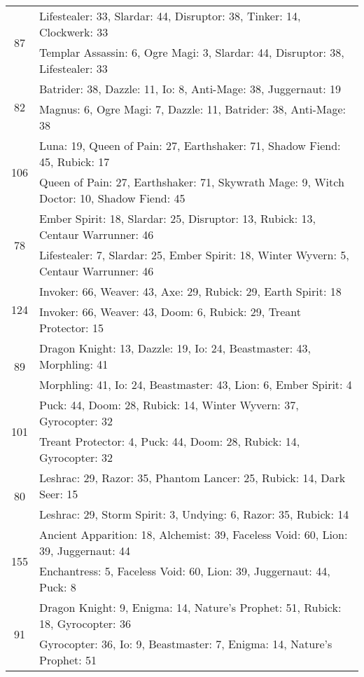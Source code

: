 \documentclass[result.tex]{subfiles}
\begin{document}
\begin{table}[H]
\begin{tabular}{ | c | p{12.5cm} | }
\hline
\multirow{2}{*}{87}
& Lifestealer: 33, Slardar: 44, Disruptor: 38, Tinker: 14, Clockwerk: 33 \\
& Templar Assassin: 6, Ogre Magi: 3, Slardar: 44, Disruptor: 38, Lifestealer: 33 \\
\hline
\multirow{2}{*}{82}
& Batrider: 38, Dazzle: 11, Io: 8, Anti-Mage: 38, Juggernaut: 19 \\
& Magnus: 6, Ogre Magi: 7, Dazzle: 11, Batrider: 38, Anti-Mage: 38 \\
\hline
\multirow{2}{*}{106}
& Luna: 19, Queen of Pain: 27, Earthshaker: 71, Shadow Fiend: 45, Rubick: 17 \\
& Queen of Pain: 27, Earthshaker: 71, Skywrath Mage: 9, Witch Doctor: 10, Shadow Fiend: 45 \\
\hline
\multirow{2}{*}{78}
& Ember Spirit: 18, Slardar: 25, Disruptor: 13, Rubick: 13, Centaur Warrunner: 46 \\
& Lifestealer: 7, Slardar: 25, Ember Spirit: 18, Winter Wyvern: 5, Centaur Warrunner: 46 \\
\hline
\multirow{2}{*}{124}
& Invoker: 66, Weaver: 43, Axe: 29, Rubick: 29, Earth Spirit: 18 \\
& Invoker: 66, Weaver: 43, Doom: 6, Rubick: 29, Treant Protector: 15 \\
\hline
\multirow{2}{*}{89}
& Dragon Knight: 13, Dazzle: 19, Io: 24, Beastmaster: 43, Morphling: 41 \\
& Morphling: 41, Io: 24, Beastmaster: 43, Lion: 6, Ember Spirit: 4 \\
\hline
\multirow{2}{*}{101}
& Puck: 44, Doom: 28, Rubick: 14, Winter Wyvern: 37, Gyrocopter: 32 \\
& Treant Protector: 4, Puck: 44, Doom: 28, Rubick: 14, Gyrocopter: 32 \\
\hline
\multirow{2}{*}{80}
& Leshrac: 29, Razor: 35, Phantom Lancer: 25, Rubick: 14, Dark Seer: 15 \\
& Leshrac: 29, Storm Spirit: 3, Undying: 6, Razor: 35, Rubick: 14 \\
\hline
\multirow{2}{*}{155}
& Ancient Apparition: 18, Alchemist: 39, Faceless Void: 60, Lion: 39, Juggernaut: 44 \\
& Enchantress: 5, Faceless Void: 60, Lion: 39, Juggernaut: 44, Puck: 8 \\
\hline
\multirow{2}{*}{91}
& Dragon Knight: 9, Enigma: 14, Nature's Prophet: 51, Rubick: 18, Gyrocopter: 36 \\
& Gyrocopter: 36, Io: 9, Beastmaster: 7, Enigma: 14, Nature's Prophet: 51 \\

\end{tabular}
\end{table}
\end{document}

